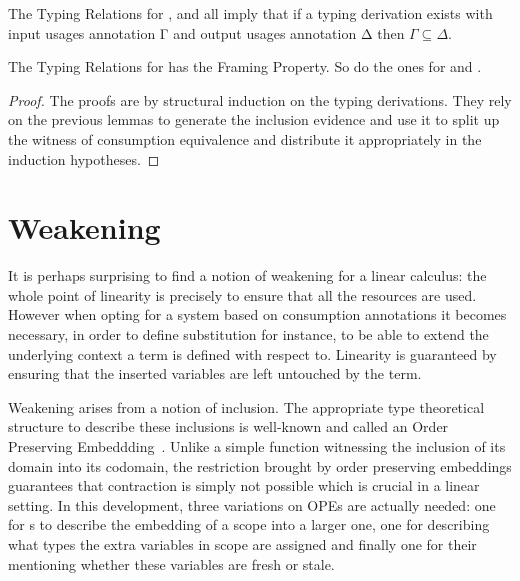 \documentclass[a4paper,UKenglish]{lipics-v2016}
\begin{document}
\begin{lemma}[Consumption]The Typing Relations for \Var{}, \Inferable{}
and \Checkable{} all imply that if a typing derivation exists with input
usages annotation Γ and output usages annotation Δ then $Γ ⊆ Δ$.
\end{lemma}

\begin{theorem}
\label{theorem:framing}
The Typing Relations for \Var{} has the Framing Property.
So do the ones for \Inferable{} and \Checkable{}.
\end{theorem}
\begin{proof}
The proofs are by structural induction on the typing derivations.
They rely on the previous lemmas to generate the inclusion evidence
and use it to split up the witness of consumption equivalence and
distribute it appropriately in the induction hypotheses.
\end{proof}


\section{Weakening}

It is perhaps surprising to find a notion of weakening for a linear
calculus: the whole point of linearity is precisely to ensure that
all the resources are used. However when opting for a system based
on consumption annotations it becomes necessary, in order to define
substitution for instance, to be able to extend the underlying
context a term is defined with respect to. Linearity is guaranteed
by ensuring that the inserted variables are left untouched by the
term.

Weakening arises from a notion of inclusion. The appropriate type
theoretical structure to describe these inclusions is well-known
and called an Order Preserving Embeddding~\cite{chapman2009thesis,altenkirch1995categorical}.
Unlike a simple function witnessing the inclusion of its domain
into its codomain, the restriction brought by order preserving
embeddings guarantees that contraction is simply not possible which
is crucial in a linear setting. In this development, three variations
on OPEs are actually needed: one for \Nat{}s to describe the embedding
of a scope into a larger one, one for \Context{} describing what types
the extra variables in scope are assigned and finally one for their
\Usages{} mentioning whether these variables are fresh or stale.
\end{document}
